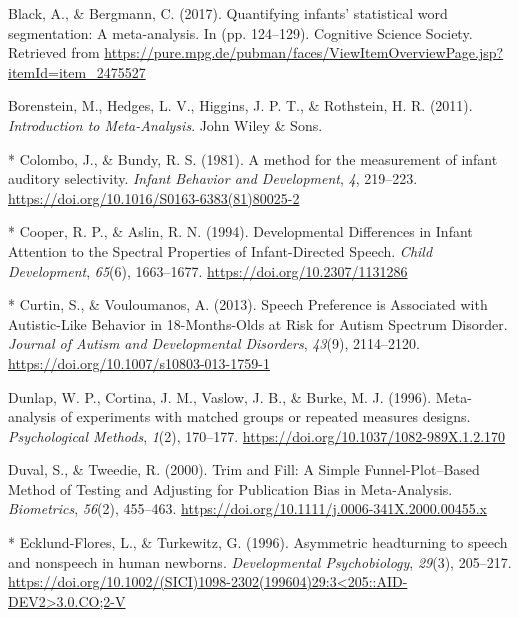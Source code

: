 \documentclass[man]{apa6}
\begin{document}
\hypertarget{ref-black_quantifying_2017}{}
Black, A., \& Bergmann, C. (2017). Quantifying infants' statistical word
segmentation: A meta-analysis. In (pp. 124--129). Cognitive Science
Society. Retrieved from
\url{https://pure.mpg.de/pubman/faces/ViewItemOverviewPage.jsp?itemId=item_2475527}

\hypertarget{ref-borenstein_introduction_2011}{}
Borenstein, M., Hedges, L. V., Higgins, J. P. T., \& Rothstein, H. R.
(2011). \emph{Introduction to Meta-Analysis}. John Wiley \& Sons.

\hypertarget{ref-colombo_method_1981}{}
{*} Colombo, J., \& Bundy, R. S. (1981). A method for the measurement of
infant auditory selectivity. \emph{Infant Behavior and Development},
\emph{4}, 219--223. \url{https://doi.org/10.1016/S0163-6383(81)80025-2}

\hypertarget{ref-cooper_developmental_1994}{}
{*} Cooper, R. P., \& Aslin, R. N. (1994). Developmental Differences in
Infant Attention to the Spectral Properties of Infant-Directed Speech.
\emph{Child Development}, \emph{65}(6), 1663--1677.
\url{https://doi.org/10.2307/1131286}

\hypertarget{ref-curtin_speech_2013}{}
{*} Curtin, S., \& Vouloumanos, A. (2013). Speech Preference is
Associated with Autistic-Like Behavior in 18-Months-Olds at Risk for
Autism Spectrum Disorder. \emph{Journal of Autism and Developmental
Disorders}, \emph{43}(9), 2114--2120.
\url{https://doi.org/10.1007/s10803-013-1759-1}

\hypertarget{ref-dunlap_meta-analysis_1996}{}
Dunlap, W. P., Cortina, J. M., Vaslow, J. B., \& Burke, M. J. (1996).
Meta-analysis of experiments with matched groups or repeated measures
designs. \emph{Psychological Methods}, \emph{1}(2), 170--177.
\url{https://doi.org/10.1037/1082-989X.1.2.170}

\hypertarget{ref-duval_trim_2000}{}
Duval, S., \& Tweedie, R. (2000). Trim and Fill: A Simple
Funnel-Plot--Based Method of Testing and Adjusting for Publication Bias
in Meta-Analysis. \emph{Biometrics}, \emph{56}(2), 455--463.
\url{https://doi.org/10.1111/j.0006-341X.2000.00455.x}

\hypertarget{ref-ecklund-flores_asymmetric_1996}{}
{*} Ecklund-Flores, L., \& Turkewitz, G. (1996). Asymmetric headturning
to speech and nonspeech in human newborns. \emph{Developmental
Psychobiology}, \emph{29}(3), 205--217.
\href{https://doi.org/10.1002/(SICI)1098-2302(199604)29:3\%3C205::AID-DEV2\%3E3.0.CO;2-V}{https://doi.org/10.1002/(SICI)1098-2302(199604)29:3\textless{}205::AID-DEV2\textgreater{}3.0.CO;2-V}
\end{document}
